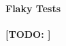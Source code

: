 \documentclass[sigconf,table]{acmart}
\newcommand{\TODO}[1]{\textbf{\textcolor{ScarletRed}{[TODO: #1]}}\xspace}
\newcommand{\TODO}[1]{}
\newcommand{\EVOSUITE}{{\sc EvoSuite}\xspace}
\newcommand{\JTEXPERT}{{\sc jTExpert}\xspace}
\newcommand{\RANDOOP}{{\sc Randoop}\xspace}
\newcommand{\TT}{{\sc T3}\xspace}
\begin{document}




\paragraph{Flaky Tests}

\TODO{}

\end{document}
